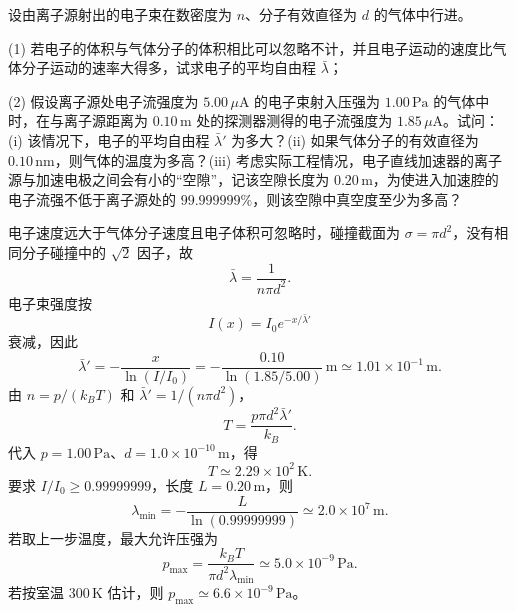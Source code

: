 \begin{question}
设由离子源射出的电子束在数密度为 $n$、分子有效直径为 $d$ 的气体中行进。

(1) 若电子的体积与气体分子的体积相比可以忽略不计，并且电子运动的速度比气体分子运动的速率大得多，试求电子的平均自由程 $\bar\lambda$；

(2) 假设离子源处电子流强度为 $5.00\,\mu\mathrm A$ 的电子束射入压强为 $1.00\,\mathrm{Pa}$ 的气体中时，在与离子源距离为 $0.10\,\mathrm m$ 处的探测器测得的电子流强度为 $1.85\,\mu\mathrm A$。试问：(i) 该情况下，电子的平均自由程 $\bar\lambda'$ 为多大？(ii) 如果气体分子的有效直径为 $0.10\,\mathrm{nm}$，则气体的温度为多高？(iii) 考虑实际工程情况，电子直线加速器的离子源与加速电极之间会有小的“空隙”，记该空隙长度为 $0.20\,\mathrm m$，为使进入加速腔的电子流强不低于离子源处的 $99.999999\%$，则该空隙中真空度至少为多高？
\begin{solution}
电子速度远大于气体分子速度且电子体积可忽略时，碰撞截面为 $\sigma=\pi d^2$，没有相同分子碰撞中的 $\sqrt2$ 因子，故
\[
\bar\lambda=\frac1{n\pi d^2}.
\]
电子束强度按
\[
I(x)=I_0e^{-x/\bar\lambda'}
\]
衰减，因此
\[
\bar\lambda'=-\frac{x}{\ln(I/I_0)}
=-\frac{0.10}{\ln(1.85/5.00)}\,\mathrm m
\simeq 1.01\times10^{-1}\,\mathrm m.
\]
由 $n=p/(k_BT)$ 和 $\bar\lambda'=1/(n\pi d^2)$，
\[
T=\frac{p\pi d^2\bar\lambda'}{k_B}.
\]
代入 $p=1.00\,\mathrm{Pa}$、$d=1.0\times10^{-10}\,\mathrm m$，得
\[
T\simeq 2.29\times10^2\,\mathrm K.
\]
要求 $I/I_0\ge 0.99999999$，长度 $L=0.20\,\mathrm m$，则
\[
\lambda_{\min}=-\frac{L}{\ln(0.99999999)}\simeq2.0\times10^7\,\mathrm m.
\]
若取上一步温度，最大允许压强为
\[
p_{\max}=\frac{k_BT}{\pi d^2\lambda_{\min}}
\simeq5.0\times10^{-9}\,\mathrm{Pa}.
\]
若按室温 $300\,\mathrm K$ 估计，则 $p_{\max}\simeq6.6\times10^{-9}\,\mathrm{Pa}$。
\end{solution}
\end{question}

